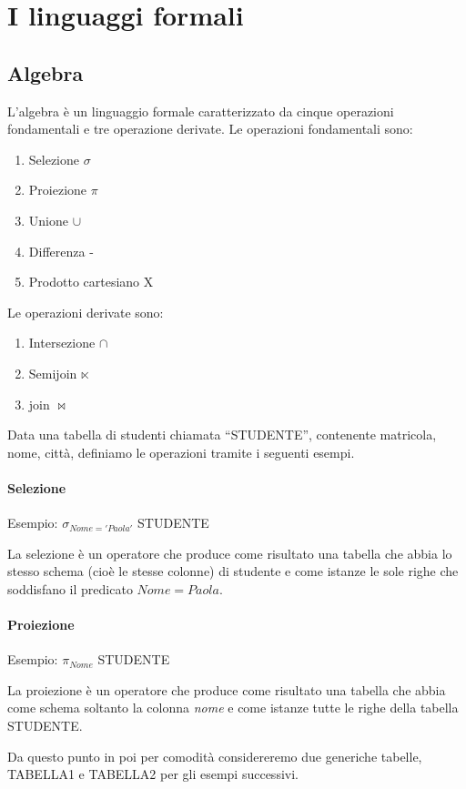 \documentclass[\main/main.tex]{subfiles}
\begin{document}
\chapter{I linguaggi formali}
\section{Algebra}
L'algebra è un linguaggio formale caratterizzato da cinque operazioni fondamentali e tre operazione derivate.
Le operazioni fondamentali sono:
\begin{enumerate}
  \item Selezione $\sigma$
  \item Proiezione $\pi$
  \item Unione $\cup$
  \item Differenza -
  \item Prodotto cartesiano X
\end{enumerate}
Le operazioni derivate sono:
\begin{enumerate}
  \item Intersezione $\cap$
  \item Semijoin $\ltimes$
  \item join $\bowtie$
\end{enumerate}

Data una tabella di studenti chiamata ``STUDENTE'', contenente matricola, nome, città, definiamo le operazioni tramite i seguenti esempi.


\subsubsection{Selezione}

Esempio: $\sigma_{Nome='Paola'}$ STUDENTE

La selezione è un operatore che produce come risultato una tabella che abbia lo stesso schema (cioè le stesse colonne) di studente e come istanze le sole righe che soddisfano il predicato $Nome=Paola$.

\subsubsection{Proiezione}

Esempio: $\pi_{Nome}$ STUDENTE

La proiezione è un operatore che produce come risultato una tabella che abbia come schema soltanto la colonna \textit{nome} e come istanze tutte le righe della tabella STUDENTE.

Da questo punto in poi per comodità considereremo due generiche tabelle, TABELLA1 e TABELLA2 per gli esempi successivi.
\end{document}
